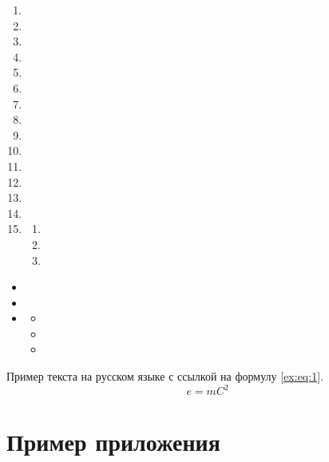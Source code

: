 \documentclass[xelatex,big]{G7-32-2017}
\begin{document}
\lipsum[1][1]
\begin{enumerate}
    \item \lipsum[1][1-2]
    \item \lipsum[1][3-4]
    \item \lipsum[1][5-6]
    \item \lipsum[1][1-2]
    \item \lipsum[1][3-4]
    \item \lipsum[1][5-6]
    \item \lipsum[1][1-2]
    \item \lipsum[1][3-4]
    \item \lipsum[1][5-6]
    \item \lipsum[1][1-2]
    \item \lipsum[1][3-4]
    \item \lipsum[1][5-6]
    \item \lipsum[1][1-2]
    \item \lipsum[1][3-4]
    \item \lipsum[1][5-6]
    \begin{enumerate}
        \item \lipsum[2][1-3]
        \item \lipsum[2][2]
        \item \lipsum[2][3]
    \end{enumerate}
\end{enumerate}
\begin{itemize}
    \item \lipsum[1][1-2]
    \item \lipsum[1][3-4]
    \item \lipsum[1][5-6]
    \begin{itemize}
        \item \lipsum[2][1-3]
        \item \lipsum[2][2]
        \item \lipsum[2][3]
    \end{itemize}
\end{itemize}

Пример текста на русском языке с ссылкой на формулу \eqref{ex:eq:1}.
\begin{equation}
    \label{ex:eq:1}
    e = mC^2
\end{equation}

\backmatter

\Conclusion

\lipsum[1-5]


\appendix

\chapter{Пример приложения}
\end{document}
